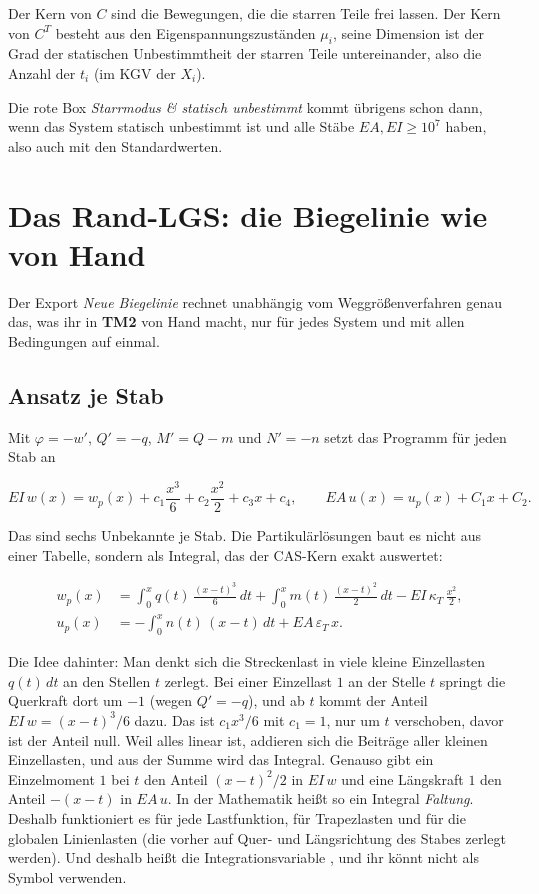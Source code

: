 Der Kern von $C$ sind die Bewegungen, die die starren Teile frei lassen. Der Kern von $C^T$ besteht
aus den Eigenspannungszuständen $\mu_i$, seine Dimension ist der Grad der statischen
Unbestimmtheit der starren Teile untereinander, also die Anzahl der $t_i$ (im KGV der $X_i$).

Die rote Box \emph{Starrmodus \& statisch unbestimmt} kommt übrigens schon dann, wenn das System
statisch unbestimmt ist und alle Stäbe $EA, EI \ge 10^7$ haben, also auch mit den
Standardwerten.

\section{Das Rand-LGS: die Biegelinie wie von Hand}\label{sec:mathe-randlgs}

Der Export \emph{Neue Biegelinie} rechnet unabhängig vom Weggrößenverfahren genau das, was ihr in
\textbf{TM2} von Hand macht, nur für jedes System und mit allen Bedingungen auf einmal.

\subsection{Ansatz je Stab}

Mit $\varphi = -w'$, $Q' = -q$, $M' = Q - m$ und $N' = -n$ setzt das Programm für jeden Stab an

\[
  EI\,w(x) = w_p(x) + c_1\frac{x^3}{6} + c_2\frac{x^2}{2} + c_3 x + c_4, \qquad
  EA\,u(x) = u_p(x) + C_1 x + C_2 .
\]

Das sind sechs Unbekannte je Stab. Die Partikulärlösungen baut es nicht aus einer Tabelle,
sondern als Integral, das der CAS-Kern exakt auswertet:

\begin{align*}
  w_p(x) &= \int_0^x q(t)\,\frac{(x-t)^3}{6}\,dt + \int_0^x m(t)\,\frac{(x-t)^2}{2}\,dt
            - EI\,\kappa_T\,\frac{x^2}{2}, \\
  u_p(x) &= -\int_0^x n(t)\,(x-t)\,dt + EA\,\varepsilon_T\,x .
\end{align*}

Die Idee dahinter: Man denkt sich die Streckenlast in viele kleine Einzellasten $q(t)\,dt$ an den
Stellen $t$ zerlegt. Bei einer Einzellast $1$ an der Stelle $t$ springt die Querkraft dort um $-1$
(wegen $Q' = -q$), und ab $t$ kommt der Anteil $EI\,w = (x-t)^3/6$ dazu. Das ist $c_1 x^3/6$ mit
$c_1 = 1$, nur um $t$ verschoben, davor ist der Anteil null. Weil alles linear ist, addieren sich
die Beiträge aller kleinen Einzellasten, und aus der Summe wird das Integral. Genauso gibt ein
Einzelmoment $1$ bei $t$ den Anteil $(x-t)^2/2$ in $EI\,w$ und eine Längskraft $1$ den Anteil
$-(x-t)$ in $EA\,u$. In der Mathematik heißt so ein
Integral \emph{Faltung}. Deshalb funktioniert es für jede Lastfunktion, für Trapezlasten und für
die globalen Linienlasten (die vorher auf Quer- und Längsrichtung des Stabes zerlegt werden). Und deshalb heißt die Integrationsvariable , und
ihr könnt  nicht als Symbol verwenden.

